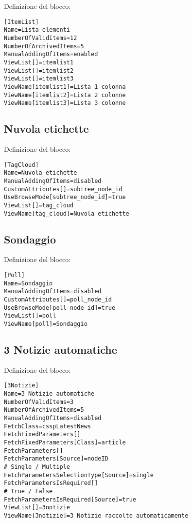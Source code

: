 Definizione del blocco:
\begin{verbatim}
[ItemList]
Name=Lista elementi
NumberOfValidItems=12
NumberOfArchivedItems=5
ManualAddingOfItems=enabled
ViewList[]=itemlist1
ViewList[]=itemlist2
ViewList[]=itemlist3
ViewName[itemlist1]=Lista 1 colonna
ViewName[itemlist2]=Lista 2 colonne
ViewName[itemlist3]=Lista 3 colonne 
\end{verbatim}
\subsection{Nuvola etichette}
Definizione del blocco:
\begin{verbatim}
[TagCloud]
Name=Nuvola etichette
ManualAddingOfItems=disabled
CustomAttributes[]=subtree_node_id
UseBrowseMode[subtree_node_id]=true
ViewList[]=tag_cloud
ViewName[tag_cloud]=Nuvola etichette
\end{verbatim}

\subsection{Sondaggio}

Definizione del blocco:
\begin{verbatim}
[Poll]
Name=Sondaggio
ManualAddingOfItems=disabled
CustomAttributes[]=poll_node_id
UseBrowseMode[poll_node_id]=true
ViewList[]=poll
ViewName[poll]=Sondaggio
\end{verbatim}
\subsection{3 Notizie automatiche}
Definizione del blocco:
\begin{verbatim}
[3Notizie]
Name=3 Notizie automatiche
NumberOfValidItems=3
NumberOfArchivedItems=5
ManualAddingOfItems=disabled
FetchClass=csspLatestNews
FetchFixedParameters[]
FetchFixedParameters[Class]=article
FetchParameters[]
FetchParameters[Source]=nodeID
# Single / Multiple
FetchParametersSelectionType[Source]=single
FetchParametersIsRequired[]
# True / False
FetchParametersIsRequired[Source]=true
ViewList[]=3notizie
ViewName[3notizie]=3 Notizie raccolte automaticamente
\end{verbatim}
